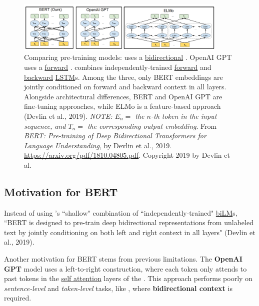 \begin{figure}[h]
\vspace{-5pt}
\centering
\includegraphics[width=0.9\textwidth]{imgs/bert_vs_elmo_vs_gpt.png}
\vspace{-5pt}
\caption{\footnotesize Comparing pre-training models:  uses a \hyperref[sec:BidirectionalLM]{bidirectional} . OpenAI GPT uses a \hyperref[sec:ForwardLM]{forward} .  combines independently-trained \hyperref[sec:ForwardLM]{forward} and \hyperref[sec:BackwardLM]{backward} \hyperref[sec:LSTM]{LSTM}s. Among the three, only BERT embeddings are jointly conditioned on forward and backward context in all layers. Alongside architectural differences, BERT and OpenAI GPT are fine-tuning approaches, while ELMo is a feature-based approach (Devlin et al., 2019). \textit{NOTE: $E_n =$ the $n$-th token in the input sequence, and $T_n =$ the corresponding output embedding}. From \emph{BERT: Pre-training of Deep Bidirectional Transformers for Language Understanding}, by Devlin et al., 2019. \url{https://arxiv.org/pdf/1810.04805.pdf}. Copyright 2019 by Devlin et al.}
\vspace{-5pt}
\label{fig:NAME}
\end{figure}





\subsection{Motivation for BERT} \label{sec:MotivationForBERT}

Instead of using 's ``shallow" combination of ``independently-trained" \hyperref[sec:BidirectionalLM]{biLM}s, ``BERT is designed to pre-train deep bidirectional representations from unlabeled text by jointly conditioning on both left and right context in all layers" (Devlin et al., 2019).   


Another motivation for BERT stems from previous limitations. The \textbf{OpenAI GPT} model uses a left-to-right construction, where each token only attends to past tokens in the \hyperref[sec:SelfAttention]{self attention} layers of the . This approach performs poorly on \emph{sentence-level} and \emph{token-level} tasks, like , where \textbf{bidirectional context} is required.  

